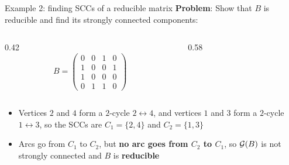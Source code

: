\documentclass[aspectratio=169]{beamer}\usepackage[]{graphicx}\usepackage[]{xcolor}
\begin{document}
\begin{frame}{Example 2: finding SCCs of a reducible matrix}
\textbf{Problem}: Show that $B$ is reducible and find its strongly connected components:
\vfill
\begin{columns}[c]
\begin{column}{0.42\textwidth}
\[
B = \begin{pmatrix}
0 & 0 & 1 & 0 \\
1 & 0 & 0 & 1 \\
1 & 0 & 0 & 0 \\
0 & 1 & 1 & 0
\end{pmatrix}
\]
\end{column}
\begin{column}{0.58\textwidth}
\centering
{}
\end{column}
\end{columns}
\vfill
\begin{itemize}
\item Vertices $2$ and $4$ form a $2$-cycle $2 \leftrightarrow 4$, and vertices $1$ and $3$ form a $2$-cycle $1 \leftrightarrow 3$, so the SCCs are $C_1 = \{2, 4\}$ and $C_2 = \{1, 3\}$
\item Arcs go from $C_1$ to $C_2$, but \textbf{no arc goes from $C_2$ to $C_1$}, so $\mathcal{G}(B)$ is not strongly connected and $B$ is \textbf{reducible}
\end{itemize}
\end{frame}
\end{document}
